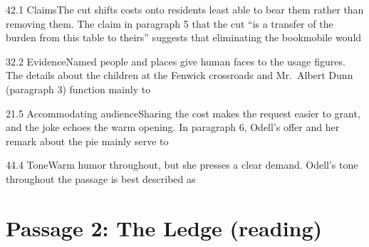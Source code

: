 \documentclass[11pt]{article}
\begin{document}
\begin{q}{4}{2.1 Claims}{The cut shifts costs onto residents least able to bear them rather than removing them.}
The claim in paragraph 5 that the cut ``is a transfer of the burden from this table to theirs'' suggests that eliminating the bookmobile would
\end{q}

\begin{q}{3}{2.2 Evidence}{Named people and places give human faces to the usage figures.}
The details about the children at the Fenwick crossroads and Mr.\ Albert Dunn (paragraph 3) function mainly to
\end{q}

\begin{q}{2}{1.5 Accommodating audience}{Sharing the cost makes the request easier to grant, and the joke echoes the warm opening.}
In paragraph 6, Odell's offer and her remark about the pie mainly serve to
\end{q}

\begin{q}{4}{4.4 Tone}{Warm humor throughout, but she presses a clear demand.}
Odell's tone throughout the passage is best described as
\end{q}

\section{Passage 2: The Ledge (reading)}
\end{document}

